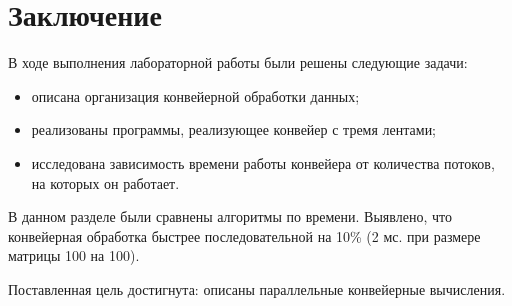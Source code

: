 \chapter*{Заключение}

В ходе выполнения лабораторной работы были решены следующие задачи:

\begin{itemize}
	\item описана организация конвейерной обработки данных;
	
	\item реализованы программы, реализующее конвейер с тремя лентами;
	\item исследована зависимость времени работы конвейера от количества потоков, на которых он работает.
\end{itemize}

В данном разделе были сравнены алгоритмы по времени.
Выявлено, что конвейерная обработка быстрее последовательной на 10\% (2 мс. при размере матрицы 100 на 100). 

Поставленная цель достигнута: описаны параллельные конвейерные вычисления.